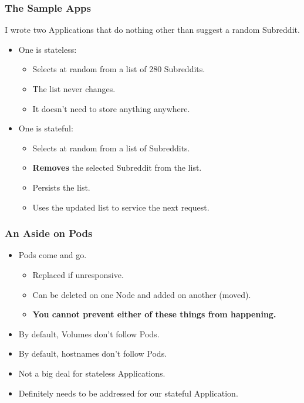     \begin{frame}
        \frametitle{The Sample Apps}
        I wrote two Applications that do nothing other than suggest a random Subreddit.\pause
        \begin{itemize}
            \item One is stateless:
            \begin{itemize}
                \item Selects at random from a list of 280 Subreddits.\pause
                \item The list never changes.\pause
                \item It doesn't need to store anything anywhere.\pause
            \end{itemize}
            \item One is stateful:
            \begin{itemize}
                \item Selects at random from a list of Subreddits.\pause
                \item \textbf{Removes} the selected Subreddit from the list.\pause
                \item Persists the list.\pause
                \item Uses the updated list to service the next request.
            \end{itemize}
        \end{itemize}
    \end{frame}

    \begin{frame}
        \frametitle{An Aside on Pods}
        \begin{itemize}
            \item Pods come and go.\pause
            \begin{itemize}
                \item Replaced if unresponsive.\pause
                \item Can be deleted on one Node and added on another (moved).\pause
                \item \textbf{You cannot prevent either of these things from happening.}\pause
            \end{itemize}
            \item By default, Volumes don't follow Pods.\pause
            \item By default, hostnames don't follow Pods.\pause
            \item Not a big deal for stateless Applications.\pause
            \item Definitely needs to be addressed for our stateful Application.
        \end{itemize}
    \end{frame}


